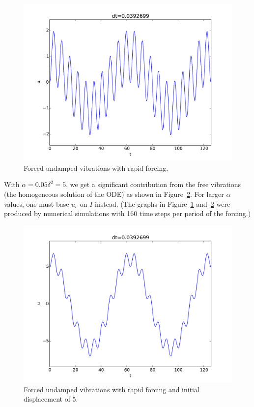 \documentclass[graybox,envcountchap,sectrefs,final]{svmonodo}
\begin{document}
\begin{figure}[!ht]  %
  \centerline{\includegraphics[width=1.0\linewidth]{fig-scaling/vib_delta10_b0_Fcos.pdf}}
  \caption{
  Forced undamped vibrations with rapid forcing. \label{sec:scale:vib:fig:Fcos_b0:3}
  }
\end{figure}


With $\alpha=0.05\delta^2=5$, we get a significant contribution from
the free vibrations (the homogeneous solution of the ODE) as
shown in Figure~\ref{sec:scale:vib:fig:Fcos_b0:4}. For larger $\alpha$
values, one must base $u_c$ on $I$ instead.
(The graphs in Figure~\ref{sec:scale:vib:fig:Fcos_b0:3} and~\ref{sec:scale:vib:fig:Fcos_b0:4} were
produced by
numerical simulations with 160 time steps per period of the forcing.)


\begin{figure}[!ht]  %
  \centerline{\includegraphics[width=1.0\linewidth]{fig-scaling/vib_delta10_b0_a5_Fcos.pdf}}
  \caption{
  Forced undamped vibrations with rapid forcing and initial displacement of 5. \label{sec:scale:vib:fig:Fcos_b0:4}
  }
\end{figure}
\end{document}
